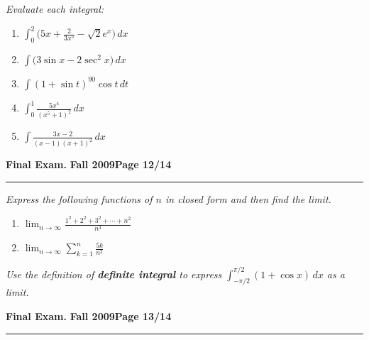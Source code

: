 \documentclass[12pt]{article}
\begin{document}
{\bigskip
{\problem[25 pts] \em  Evaluate each integral:} 
\begin{enumerate}
\item $\displaystyle{\int_0^2 \big( 5x + \frac{2}{3x^5} - \sqrt{2} e^x \big)\, dx}$
\vspace{2.5cm}
\item $\displaystyle{\int \big( 3\sin x - 2\sec^2 x \big)\, dx}$
\vspace{2.5cm}
\item $\displaystyle{\int ( 1 + \sin t)^{90} \cos t\, dt}$
\vspace{2.5cm}
\item $\displaystyle{\int_0^1 \frac{5x^4}{(x^5+1)^2}\, dx}$
\vspace{2.5cm}
\item $\displaystyle{\int \frac{3x-2}{(x-1)(x+1)^2}\, dx}$
\end{enumerate}
\newpage

\hfill{\large\bf Final Exam.}\hfill{\large\bf
  Fall 2009}\hfill{\large\bf Page 12/14}\hrule

\bigskip
{\problem[20 pts] \em Express the following functions of $n$ in closed
  form and then find the limit.}
\begin{enumerate}
\item  $\displaystyle{\lim_{n \to \infty} \frac{1^2+2^2+3^2+ \dotsb +
      n^2}{n^3}}$
\vspace{5cm}
\item  $\displaystyle{\lim_{n \to \infty} \sum_{k=1}^n \frac{5k}{n^2}}$
\vspace{5cm}
\end{enumerate}
{\problem[10 pts] \em Use the definition of \textbf{definite integral} to
  express $\int_{-\pi/2}^{\pi/2} (1+ \cos x)\, dx$ as a limit.}
\newpage

\hfill{\large\bf Final Exam.}\hfill{\large\bf
  Fall 2009}\hfill{\large\bf Page 13/14}\hrule

}
\end{document}
